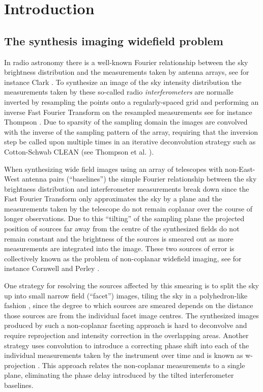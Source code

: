\chapter{Introduction}
\section{The synthesis imaging widefield problem}
In radio astronomy there is a well-known Fourier relationship between the sky brightness distribution and the measurements taken by antenna arrays, see for instance 
Clark \cite[Lecture 1]{taylor1999synthesis}. To synthesize an image of the sky intensity distribution the measurements taken by these so-called radio \textit{interferometers}
are normalle inverted by resampling the points onto a regularly-spaced grid and performing an inverse Fast Fourier Transform \cite{cochran1967fast} on the resampled measurements see for instance 
Thompson \cite{thompson1974interpolation}. Due to sparsity of the sampling domain the images are convolved with the inverse of the sampling pattern of the array, requiring that
the inversion step be called upon multiple times in an iterative deconvolution strategy such as Cotton-Schwab CLEAN (see Thompson et al. \cite[ch 11]{thompson2008interferometry}).

When synthesizing wide field images using an array of telescopes with non-East-West antenna pairs (``baselines'') the simple Fourier relationship between the sky brightness 
distribution and interferometer measurements break down since the Fast Fourier Transform only approximates the sky by a plane and the measurements taken by the telescope do not
remain coplanar over the course of longer observations. Due to this ``tilting'' of the sampling plane the projected position of sources far away from the centre of the synthesized 
fields do not remain constant and the brightness of the sources is smeared out as more measurements are integrated into the image. These two sources of error is collectively known
as the problem of non-coplanar widefield imaging, see for instance Cornwell and Perley \cite{cornwell1992radio}.

One strategy for resolving the sources affected by this smearing is to split the sky up into small narrow field (``facet'') images, tiling the sky in a 
polyhedron-like fashion \cite{cornwell1992radio}, since the degree to which sources are smeared depends on the distance those sources are from the individual facet image centres. The synthesized
images produced by such a non-coplanar faceting approach is hard to deconvolve and require reprojection and intensity correction in the overlapping areas. Another strategy uses 
convolution to introduce a correcting phase shift into each of the individual measurements taken by the instrument over time and is known as w-projection \cite{cornwell2008noncoplanar}. This approach
relates the non-coplanar measurements to a single plane, eliminating the phase delay introduced by the tilted interferometer baselines. 

